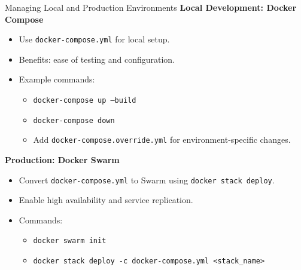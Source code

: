 \documentclass[notes]{beamer}
\begin{document}
{
\begin{frame}{Managing Local and Production Environments}
    \textbf{Local Development: Docker Compose}
    \begin{itemize}
        \item Use \texttt{docker-compose.yml} for local setup.
        \item Benefits: ease of testing and configuration.
        \item Example commands:
        \begin{itemize}
            \item \texttt{docker-compose up --build}
            \item \texttt{docker-compose down}
            \item Add \texttt{docker-compose.override.yml} for environment-specific changes.
        \end{itemize}
    \end{itemize}
    \textbf{Production: Docker Swarm}
    \begin{itemize}
        \item Convert \texttt{docker-compose.yml} to Swarm using \texttt{docker stack deploy}.
        \item Enable high availability and service replication.
        \item Commands:
        \begin{itemize}
            \item \texttt{docker swarm init}
            \item \texttt{docker stack deploy -c docker-compose.yml <stack\_name>}
        \end{itemize}
    \end{itemize}
\end{frame}

}
\end{document}
